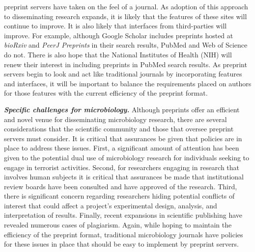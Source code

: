 \documentclass[11pt,]{article}
\begin{document}
preprint servers have taken on the feel of a journal. As adoption of
this approach to disseminating research expands, it is likely that the
features of these sites will continue to improve. It is also likely that
interfaces from third-parties will improve. For example, although Google
Scholar includes preprints hosted at \emph{bioRxiv} and \emph{PeerJ
Preprints} in their search results, PubMed and Web of Science do not.
There is also hope that the National Institutes of Health (NIH) will
renew their interest in including preprints in PubMed search results. As
preprint servers begin to look and act like traditional journals by
incorporating features and interfaces, it will be important to balance
the requirements placed on authors for those features with the current
efficiency of the preprint format.

\textbf{\emph{Specific challenges for microbiology.}} Although preprints
offer an efficient and novel venue for disseminating microbiology
research, there are several considerations that the scientific community
and those that oversee preprint servers must consider. It is critical
that assurances be given that policies are in place to address these
issues. First, a significant amount of attention has been given to the
potential dual use of microbiology research for individuals seeking to
engage in terrorist activities. Second, for researchers engaging in
research that involves human subjects it is critical that assurances be
made that institutional review boards have been consulted and have
approved of the research. Third, there is significant concern regarding
researchers hiding potential conflicts of interest that could affect a
project's experimental design, analysis, and interpretation of results.
Finally, recent expansions in scientific publishing have revealed
numerous cases of plagiarism. Again, while hoping to maintain the
efficiency of the preprint format, traditional microbiology journals
have policies for these issues in place that should be easy to implement
by preprint servers.
\end{document}
